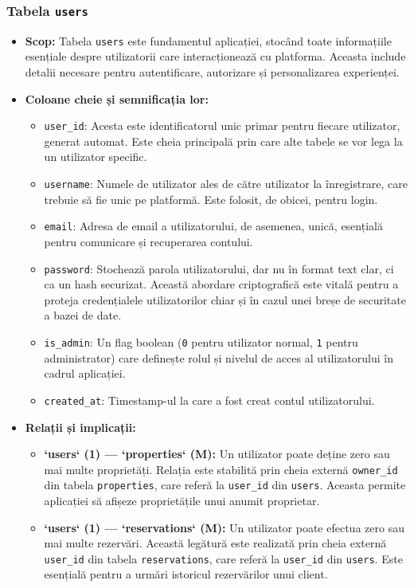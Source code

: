 \documentclass[12pt, a4paper, oneside, romanian]{teza-upb}
\begin{document}
\subsubsection{Tabela \texttt{users}}
\begin{itemize}
	\item \textbf{Scop:} Tabela \texttt{users} este fundamentul aplicației, stocând toate informațiile esențiale despre utilizatorii care interacționează cu platforma. Aceasta include detalii necesare pentru autentificare, autorizare și personalizarea experienței.
	\item \textbf{Coloane cheie și semnificația lor:}
	\begin{itemize}
		\item \texttt{user\_id}: Acesta este identificatorul unic primar pentru fiecare utilizator, generat automat. Este cheia principală prin care alte tabele se vor lega la un utilizator specific.
		\item \texttt{username}: Numele de utilizator ales de către utilizator la înregistrare, care trebuie să fie unic pe platformă. Este folosit, de obicei, pentru login.
		\item \texttt{email}: Adresa de email a utilizatorului, de asemenea, unică, esențială pentru comunicare și recuperarea contului.
		\item \texttt{password}: Stochează parola utilizatorului, dar nu în format text clar, ci ca un hash securizat. Această abordare criptografică este vitală pentru a proteja credențialele utilizatorilor chiar și în cazul unei breșe de securitate a bazei de date.
		\item \texttt{is\_admin}: Un flag boolean (\texttt{0} pentru utilizator normal, \texttt{1} pentru administrator) care definește rolul și nivelul de acces al utilizatorului în cadrul aplicației.
		\item \texttt{created\_at}: Timestamp-ul la care a fost creat contul utilizatorului.
	\end{itemize}
	\item \textbf{Relații și implicații:}
	\begin{itemize}
		\item \textbf{`users` (1) --- `properties` (M):} Un utilizator poate deține zero sau mai multe proprietăți. Relația este stabilită prin cheia externă \texttt{owner\_id} din tabela \texttt{properties}, care referă la \texttt{user\_id} din \texttt{users}. Aceasta permite aplicației să afișeze proprietățile unui anumit proprietar.
		\item \textbf{`users` (1) --- `reservations` (M):} Un utilizator poate efectua zero sau mai multe rezervări. Această legătură este realizată prin cheia externă \texttt{user\_id} din tabela \texttt{reservations}, care referă la \texttt{user\_id} din \texttt{users}. Este esențială pentru a urmări istoricul rezervărilor unui client.
	\end{itemize}
\end{itemize}
\end{document}
